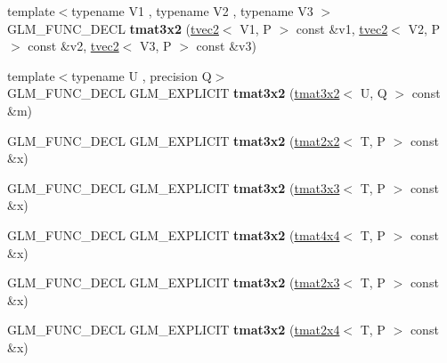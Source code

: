 \begin{DoxyCompactItemize}
\item 
\mbox{\label{structglm_1_1tmat3x2_a12d9e62a09e2d082664841f719999405}} 
{\footnotesize template$<$typename V1 , typename V2 , typename V3 $>$ }\\G\+L\+M\+\_\+\+F\+U\+N\+C\+\_\+\+D\+E\+CL {\bfseries tmat3x2} (\hyperlink{structglm_1_1tvec2}{tvec2}$<$ V1, P $>$ const \&v1, \hyperlink{structglm_1_1tvec2}{tvec2}$<$ V2, P $>$ const \&v2, \hyperlink{structglm_1_1tvec2}{tvec2}$<$ V3, P $>$ const \&v3)
\item 
\mbox{\label{structglm_1_1tmat3x2_aca2535c7f0a60d41ce48c7cd0a7f83b9}} 
{\footnotesize template$<$typename U , precision Q$>$ }\\G\+L\+M\+\_\+\+F\+U\+N\+C\+\_\+\+D\+E\+CL G\+L\+M\+\_\+\+E\+X\+P\+L\+I\+C\+IT {\bfseries tmat3x2} (\hyperlink{structglm_1_1tmat3x2}{tmat3x2}$<$ U, Q $>$ const \&m)
\item 
\mbox{\label{structglm_1_1tmat3x2_a9af622af900c3ddb1a075d5083d700bd}} 
G\+L\+M\+\_\+\+F\+U\+N\+C\+\_\+\+D\+E\+CL G\+L\+M\+\_\+\+E\+X\+P\+L\+I\+C\+IT {\bfseries tmat3x2} (\hyperlink{structglm_1_1tmat2x2}{tmat2x2}$<$ T, P $>$ const \&x)
\item 
\mbox{\label{structglm_1_1tmat3x2_a3578a509c6af05bf0319417803261991}} 
G\+L\+M\+\_\+\+F\+U\+N\+C\+\_\+\+D\+E\+CL G\+L\+M\+\_\+\+E\+X\+P\+L\+I\+C\+IT {\bfseries tmat3x2} (\hyperlink{structglm_1_1tmat3x3}{tmat3x3}$<$ T, P $>$ const \&x)
\item 
\mbox{\label{structglm_1_1tmat3x2_ab66003b5f215e9eb712561b3b0ec39d2}} 
G\+L\+M\+\_\+\+F\+U\+N\+C\+\_\+\+D\+E\+CL G\+L\+M\+\_\+\+E\+X\+P\+L\+I\+C\+IT {\bfseries tmat3x2} (\hyperlink{structglm_1_1tmat4x4}{tmat4x4}$<$ T, P $>$ const \&x)
\item 
\mbox{\label{structglm_1_1tmat3x2_a1befb2e603dab6356eaf74504fa6bdfe}} 
G\+L\+M\+\_\+\+F\+U\+N\+C\+\_\+\+D\+E\+CL G\+L\+M\+\_\+\+E\+X\+P\+L\+I\+C\+IT {\bfseries tmat3x2} (\hyperlink{structglm_1_1tmat2x3}{tmat2x3}$<$ T, P $>$ const \&x)
\item 
\mbox{\label{structglm_1_1tmat3x2_abc4f2fcc9002757744b440948ad516ce}} 
G\+L\+M\+\_\+\+F\+U\+N\+C\+\_\+\+D\+E\+CL G\+L\+M\+\_\+\+E\+X\+P\+L\+I\+C\+IT {\bfseries tmat3x2} (\hyperlink{structglm_1_1tmat2x4}{tmat2x4}$<$ T, P $>$ const \&x)

\end{DoxyCompactItemize}
